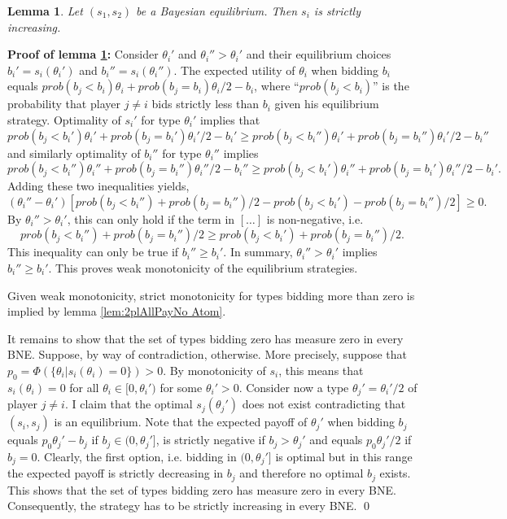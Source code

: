 \documentclass[a4paper,11pt]{article}
\newtheorem{lemma}{Lemma}
\begin{document}
\begin{lemma}\label{lem:2plAllPayMono}
  Let $(s_1,s_2)$ be a Bayesian equilibrium. Then $s_i$ is strictly increasing.
\end{lemma}
\textbf{Proof of lemma \ref{lem:2plAllPayMono}:} Consider $\theta _i'$ and $\theta _i''>\theta _i'$ and their equilibrium choices $b_i'=s_i(\theta _i')$ and $b_i''=s_i(\theta _i'')$. The expected utility of $\theta _i$ when bidding $b_i$ equals $prob(b_j<b_i)\theta _i+prob(b_j=b_i)\theta _i/2-b_i$, where ``$prob(b_j<b_i)$'' is the probability that player $j\neq i$ bids strictly less than $b_i$ given his equilibrium strategy. Optimality of $s_i'$ for type $\theta _i'$ implies that
\begin{equation*}
  prob(b_j<b_i')\theta _i'+prob(b_j=b_i')\theta _i'/2-b_i'\geq prob(b_j<b_i'')\theta _i'+prob(b_j=b_i'')\theta _i'/2-b_i''
\end{equation*}
and similarly optimality of $b_i''$ for type $\theta _i''$ implies
\begin{equation*}
  prob(b_j<b_i'')\theta _i''+prob(b_j=b_i'')\theta _i''/2-b_i''\geq prob(b_j<b_i')\theta _i''+prob(b_j=b_i')\theta _i''/2-b_i'.
\end{equation*}
Adding these two inequalities yields,
\begin{equation*}
  (\theta _i''-\theta _i') \left[prob(b_j<b_i'')+prob(b_j=b_i'')/2-prob(b_j<b_i')-prob(b_j=b_i'')/2\right]\geq 0. 
\end{equation*}
By $\theta _i''>\theta _i'$, this can only hold if the term in $[\dots]$ is non-negative, i.e. 
\begin{equation*}
  prob(b_j<b_i'')+prob(b_j=b_i'')/2\geq prob(b_j<b_i')+prob(b_j=b_i'')/2.
\end{equation*}
This inequality can only be true if $b_i''\geq b_i'$. In summary, $\theta _i''>\theta _i'$ implies $b_i''\geq b_i'$. This proves weak monotonicity of the equilibrium strategies.

Given weak monotonicity, strict monotonicity for types bidding more than zero is implied by lemma \ref{lem:2plAllPayNo Atom}.

It remains to show that the set of types bidding zero has measure zero in every BNE. Suppose, by way of contradiction, otherwise. More precisely, suppose that $p_0=\Phi(\{\theta _i| s_i(\theta _i)=0\})>0$. By monotonicity of $s_i$, this means that $s_i(\theta _i)=0$ for all $\theta _i\in[0,\theta _i')$ for some $\theta _i'>0$. Consider now a type $\theta _j'=\theta _i'/2$ of player $j\neq i$. I claim that the optimal $s_j(\theta _j')$ does not exist contradicting that $(s_i,s_j)$ is an equilibrium. Note that the expected payoff of $\theta _j'$ when bidding $b_j$ equals $p_0 \theta _j'-b_j$ if $b_j\in(0,\theta _j']$, is strictly negative if $b_j>\theta _j'$ and equals $p_0\theta _j'/2$ if $b_j=0$. Clearly, the first option, i.e. bidding in $(0,\theta _j']$ is optimal but in this range the expected payoff is strictly decreasing in $b_j$ and therefore no optimal $b_j$ exists. This shows that the set of types bidding zero has measure zero in every BNE. Consequently, the strategy has to be strictly increasing in every BNE.
\qed
\end{document}
